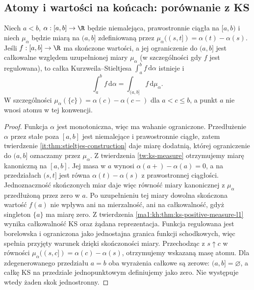 \subsection*{Atomy i wartości na końcach: porównanie z KS}
\begin{stwierdzenie}\label{st:ks-miara-konwencja}
Niech $a<b$, $\alpha:[a,b]\to\R$ będzie niemalejąca,
prawostronnie ciągła na $[a,b)$ i niech $\mu_\alpha$
będzie miarą na $(a,b]$ zdefiniowaną przez $\mu_\alpha((s,t])=\alpha(t)-\alpha(s)$. Jeśli $f:[a,b]\to\R$ ma skończone wartości, a jej
ograniczenie do $(a,b]$ jest całkowalne względem uzupełnionej
miary $\mu_\alpha$ (w szczególności gdy $f$ jest regulowana),
to całka Kurzweila--Stieltjesa $\int_a^b f\,\mathrm d\alpha$ istnieje i
\[
\int_a^b f\,\mathrm d\alpha=\int_{(a,b]}f\,\mathrm d\mu_\alpha.
\]
W szczególności $\mu_\alpha(\{c\})=\alpha(c)-\alpha(c-)$ dla $a<c\le b$, a punkt $a$ nie wnosi atomu w tej konwencji.
\end{stwierdzenie}
\begin{proof}
Funkcja $\alpha$ jest monotoniczna, więc ma wahanie ograniczone. Przedłużenie $\alpha$ przez stałe poza $[a,b]$ jest niemalejące i prawostronnie ciągłe, zatem twierdzenie \ref{it:thm:stieltjes-construction} daje miarę dodatnią, której ograniczenie do $(a,b]$ oznaczamy przez $\mu_\alpha$. Z twierdzenia \ref{tw:ks-measure} otrzymujemy miarę
kanoniczną na $[a,b]$. Jej masa w $a$ wynosi $\alpha(a+)-\alpha(a)=0$, a na przedziałach $(s,t]$ jest równa $\alpha(t)-\alpha(s)$ z prawostronnej ciągłości. Jednoznaczność skończonych miar daje więc równość miary kanonicznej z $\mu_\alpha$ przedłużoną przez zero w $a$.
Po uzupełnieniu tej miary dowolna skończona wartość
$f(a)$ nie wpływa ani na mierzalność, ani na całkowalność,
gdyż singleton $\{a\}$ ma miarę zero. Z twierdzenia
\ref{ma1:kh:thm:ks-positive-measure-l1} wynika
całkowalność KS oraz żądana reprezentacja.
Funkcja regulowana jest borelowska i ograniczona
jako jednostajna granica funkcji schodkowych, więc
spełnia przyjęty warunek dzięki skończoności miary.
Przechodząc z $s\uparrow c$ w równości $\mu_\alpha((s,c])=\alpha(c)-\alpha(s)$, otrzymujemy wskazaną masę atomu.
Dla zdegenerowanego przedziału $a=b$ oba wyrażenia
całkowe są zerowe: $(a,b]=\varnothing$, a całkę KS
na przedziale jednopunktowym definiujemy jako zero.
Nie występuje wtedy żaden skok jednostronny.
\end{proof}
